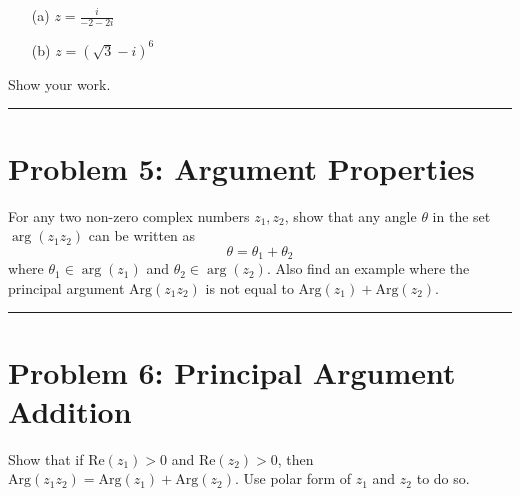 \documentclass{article}
\begin{document}
\begin{enumerate}
    \item[(a)] $z = \frac{i}{-2-2i}$
    
    \vspace{.5cm} %
    
    \item[(b)] $z = (\sqrt{3}-i)^6$
    
    \vspace{.5cm} %
\end{enumerate}

Show your work.

\hrule

\newpage
\section*{Problem 5: Argument Properties}
For any two non-zero complex numbers $z_1, z_2$, show that any angle $\theta$ in the set $\arg{(z_1z_2)}$ can be written as
\[ \theta = \theta_1 + \theta_2 \]
where $\theta_1 \in \arg(z_1)$ and $\theta_2 \in \arg(z_2)$. Also find an example where the principal argument $\text{Arg} (z_1z_2)$ is not equal to $\text{Arg} (z_1) + \text{Arg} (z_2)$.

\vspace{.5cm} %

\hrule

\newpage
\section*{Problem 6: Principal Argument Addition}
Show that if $\text{Re}(z_1)>0$ and $\text{Re}(z_2)>0$, then $\text{Arg}(z_1z_2) = \text{Arg}(z_1)+\text{Arg}(z_2)$. Use polar form of $z_1$ and $z_2$ to do so.

\vspace{.5cm} %
\end{document}
